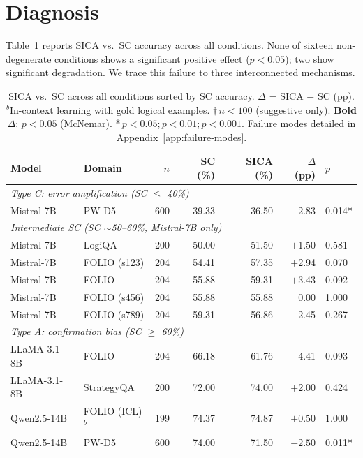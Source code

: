 \section{Diagnosis}
\label{sec:diagnosis}

Table~\ref{tab:main_results} reports SICA vs.\ SC accuracy across all conditions. None of sixteen non-degenerate conditions shows a significant positive effect ($p < 0.05$); two show significant degradation. We trace this failure to three interconnected mechanisms.

\begin{table}[t]
\centering
\small
\caption{SICA vs.\ SC across all conditions sorted by SC accuracy. $\Delta$ = SICA $-$ SC (pp). $^b$In-context learning with gold logical examples. $\dagger$\,$n < 100$ (suggestive only). \textbf{Bold $\Delta$}: $p < 0.05$ (McNemar). {*}\,$p < 0.05$;\enspace{**}\,$p < 0.01$;\enspace{***}\,$p < 0.001$. Failure modes detailed in Appendix~\ref{app:failure-modes}.}
\label{tab:main_results}
\begin{tabular}{@{}llrrrrl@{}}
\toprule
Model & Domain & $n$ & SC (\%) & SICA (\%) & $\Delta$ (pp) & $p$ \\
\midrule
\multicolumn{7}{l}{\textit{Type C: error amplification (SC $\leq$ 40\%)}} \\
Mistral-7B & PW-D5 & 600 & 39.33 & 36.50 & $\mathbf{-2.83}$ & 0.014{*} \\
\midrule
\multicolumn{7}{l}{\textit{Intermediate SC (SC $\sim$50--60\%, Mistral-7B only)}} \\
Mistral-7B & LogiQA & 200 & 50.00 & 51.50 & $+$1.50 & 0.581 \\
Mistral-7B & FOLIO (s123) & 204 & 54.41 & 57.35 & $+$2.94 & 0.070 \\
Mistral-7B & FOLIO & 204 & 55.88 & 59.31 & $+$3.43 & 0.092 \\
Mistral-7B & FOLIO (s456) & 204 & 55.88 & 55.88 & 0.00 & 1.000 \\
Mistral-7B & FOLIO (s789) & 204 & 59.31 & 56.86 & $-$2.45 & 0.267 \\
\midrule
\multicolumn{7}{l}{\textit{Type A: confirmation bias (SC $\geq$ 60\%)}} \\
LLaMA-3.1-8B & FOLIO & 204 & 66.18 & 61.76 & $-$4.41 & 0.093 \\
LLaMA-3.1-8B & StrategyQA & 200 & 72.00 & 74.00 & $+$2.00 & 0.424 \\
Qwen2.5-14B & FOLIO (ICL)$^b$ & 199 & 74.37 & 74.87 & $+$0.50 & 1.000 \\
Qwen2.5-14B & PW-D5 & 600 & 74.00 & 71.50 & $\mathbf{-2.50}$ & 0.011{*} \\

\end{tabular}
\end{table}
